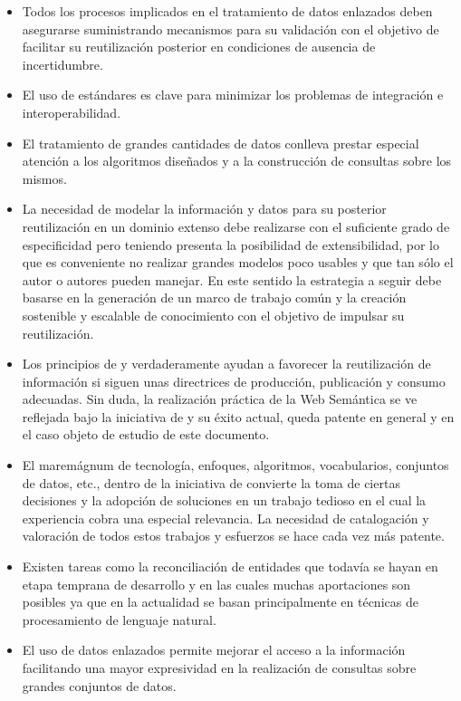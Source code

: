 \begin{itemize}
 \item Todos los procesos implicados en el tratamiento de datos enlazados deben asegurarse suministrando 
mecanismos para su validación con el objetivo de facilitar su reutilización posterior en condiciones 
de ausencia de incertidumbre.
  \item El uso de estándares es clave para minimizar los problemas de integración e interoperabilidad.
 \item El tratamiento de grandes cantidades de datos conlleva prestar especial atención a los algoritmos diseñados y 
a la construcción de consultas sobre los mismos.
 \item La necesidad de modelar la información y datos para su posterior reutilización en un dominio extenso debe realizarse 
con el suficiente grado de especificidad pero teniendo presenta la posibilidad de extensibilidad, por lo que es conveniente 
no realizar grandes modelos poco usables y que tan sólo el autor o autores pueden manejar. En este sentido la estrategia 
a seguir debe basarse en la generación de un marco de trabajo común y la creación sostenible y escalable de conocimiento 
con el objetivo de impulsar su reutilización.
 \item Los principios de \linkeddata y \opendata verdaderamente ayudan a favorecer la reutilización de información si siguen 
unas directrices de producción, publicación y consumo adecuadas. Sin duda, la realización práctica de la Web Semántica 
se ve reflejada bajo la iniciativa de \linkeddata y su éxito actual, queda patente en general y en el caso objeto de estudio 
de este documento.
 \item El maremágnum de tecnología, enfoques, algoritmos, vocabularios, conjuntos de datos, etc., dentro de la iniciativa de 
\linkeddata convierte la toma de ciertas decisiones y la adopción de soluciones en un trabajo tedioso en el cual la experiencia 
cobra una especial relevancia. La necesidad de catalogación y valoración de todos estos trabajos y esfuerzos se hace cada 
vez más patente.
 \item Existen tareas como la reconciliación de entidades que todavía se hayan en etapa temprana de desarrollo y en las cuales 
muchas aportaciones son posibles ya que en la actualidad se basan principalmente en técnicas de procesamiento de lenguaje natural.
 \item El uso de datos enlazados permite mejorar el acceso a la información facilitando una mayor expresividad en la realización 
de consultas sobre grandes conjuntos de datos.

\end{itemize}

